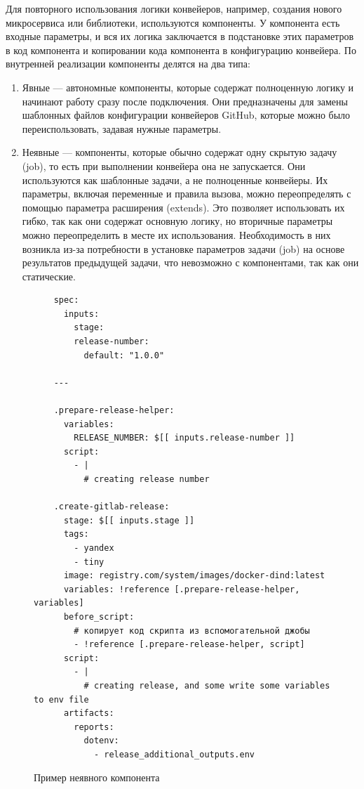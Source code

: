 Для повторного использования логики конвейеров, например, создания нового микросервиса или библиотеки, используются компоненты.
У компонента есть входные параметры, и вся их логика заключается в подстановке этих параметров в код компонента и копировании кода компонента в конфигурацию конвейера.
По внутренней реализации компоненты делятся на два типа:
\begin{enumerate}
  \item Явные — автономные компоненты, которые содержат полноценную логику и начинают работу сразу после подключения.
  Они предназначены для замены шаблонных файлов конфигурации конвейеров GitHub, которые можно было переиспользовать, задавая нужные параметры.
  \item Неявные — компоненты, которые обычно содержат одну скрытую задачу (job), то есть при выполнении конвейера она не запускается.
  Они используются как шаблонные задачи, а не полноценные конвейеры.
  Их параметры, включая переменные и правила вызова, можно переопределять с помощью параметра расширения (extends).
  Это позволяет использовать их гибко, так как они содержат основную логику, но вторичные параметры можно переопределить в месте их использования.
  Необходимость в них возникла из-за потребности в установке параметров задачи (job) на основе результатов предыдущей задачи, что невозможно с компонентами, так как они статические.
\end{enumerate}

\begin{figure}
  \centering
  \scriptsize
  \begin{verbatim}
    spec:
      inputs:
        stage:
        release-number:
          default: "1.0.0"

    ---

    .prepare-release-helper:
      variables:
        RELEASE_NUMBER: $[[ inputs.release-number ]]
      script:
        - |
          # creating release number

    .create-gitlab-release:
      stage: $[[ inputs.stage ]]
      tags:
        - yandex
        - tiny
      image: registry.com/system/images/docker-dind:latest
      variables: !reference [.prepare-release-helper, variables]
      before_script:
        # копирует код скрипта из вспомогательной джобы
        - !reference [.prepare-release-helper, script]
      script:
        - |
          # creating release, and some write some variables to env file
      artifacts:
        reports:
          dotenv:
            - release_additional_outputs.env
  \end{verbatim}
  \caption{Пример неявного компонента}
  \label{fig:implicit-component-code}
\end{figure}

